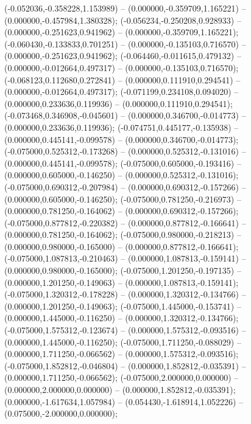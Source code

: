  (-0.052036,-0.358228,1.153989) -- (0.000000,-0.359709,1.165221) -- (0.000000,-0.457984,1.380328);
 (-0.056234,-0.250208,0.928933) -- (0.000000,-0.251623,0.941962) -- (0.000000,-0.359709,1.165221);
 (-0.060430,-0.133833,0.701251) -- (0.000000,-0.135103,0.716570) -- (0.000000,-0.251623,0.941962);
 (-0.064460,-0.011615,0.479132) -- (0.000000,-0.012664,0.497317) -- (0.000000,-0.135103,0.716570);
 (-0.068123,0.112680,0.272841) -- (0.000000,0.111910,0.294541) -- (0.000000,-0.012664,0.497317);
 (-0.071199,0.234108,0.094020) -- (0.000000,0.233636,0.119936) -- (0.000000,0.111910,0.294541);
 (-0.073468,0.346908,-0.045601) -- (0.000000,0.346700,-0.014773) -- (0.000000,0.233636,0.119936);
 (-0.074751,0.445177,-0.135938) -- (0.000000,0.445141,-0.099578) -- (0.000000,0.346700,-0.014773);
 (-0.075000,0.525312,-0.173268) -- (0.000000,0.525312,-0.131016) -- (0.000000,0.445141,-0.099578);
 (-0.075000,0.605000,-0.193416) -- (0.000000,0.605000,-0.146250) -- (0.000000,0.525312,-0.131016);
 (-0.075000,0.690312,-0.207984) -- (0.000000,0.690312,-0.157266) -- (0.000000,0.605000,-0.146250);
 (-0.075000,0.781250,-0.216973) -- (0.000000,0.781250,-0.164062) -- (0.000000,0.690312,-0.157266);
 (-0.075000,0.877812,-0.220382) -- (0.000000,0.877812,-0.166641) -- (0.000000,0.781250,-0.164062);
 (-0.075000,0.980000,-0.218213) -- (0.000000,0.980000,-0.165000) -- (0.000000,0.877812,-0.166641);
 (-0.075000,1.087813,-0.210463) -- (0.000000,1.087813,-0.159141) -- (0.000000,0.980000,-0.165000);
 (-0.075000,1.201250,-0.197135) -- (0.000000,1.201250,-0.149063) -- (0.000000,1.087813,-0.159141);
 (-0.075000,1.320312,-0.178228) -- (0.000000,1.320312,-0.134766) -- (0.000000,1.201250,-0.149063);
 (-0.075000,1.445000,-0.153741) -- (0.000000,1.445000,-0.116250) -- (0.000000,1.320312,-0.134766);
 (-0.075000,1.575312,-0.123674) -- (0.000000,1.575312,-0.093516) -- (0.000000,1.445000,-0.116250);
 (-0.075000,1.711250,-0.088029) -- (0.000000,1.711250,-0.066562) -- (0.000000,1.575312,-0.093516);
 (-0.075000,1.852812,-0.046804) -- (0.000000,1.852812,-0.035391) -- (0.000000,1.711250,-0.066562);
 (-0.075000,2.000000,0.000000) -- (0.000000,2.000000,0.000000) -- (0.000000,1.852812,-0.035391);
 (0.000000,-1.617634,1.057984) -- (0.054430,-1.618914,1.052226) -- (0.075000,-2.000000,0.000000);
